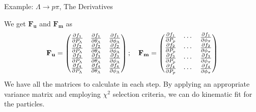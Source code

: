 \documentclass[
	xcolor=dvipsnames,
	aspectratio=169,	
	10pt, 
	]{beamer}
\begin{document}
\begin{frame}{Example: $\Lambda\to p\pi$, The Derivatives}
	\begin{block}{}
		 We get $\mathbf{F_u}$ and $\mathbf{F_m}$ as
		\begin{align}
			\mathbf{F_u}=
			\begin{pmatrix}
				\frac{\partial f_1}{\partial P_\Lambda}&\frac{\partial f_1}{\partial \theta_\Lambda}&\frac{\partial f_1}{\partial \phi_\Lambda}\\
				\frac{\partial f_2}{\partial P_\Lambda}&\frac{\partial f_2}{\partial \theta_\Lambda}&\frac{\partial f_2}{\partial \phi_\Lambda}\\
				\frac{\partial f_3}{\partial P_\Lambda}&\frac{\partial f_3}{\partial \theta_\Lambda}&\frac{\partial f_3}{\partial \phi_\Lambda}\\
				\frac{\partial f_4}{\partial P_\Lambda}&\frac{\partial f_4}{\partial \theta_\Lambda}&\frac{\partial f_4}{\partial \phi_\Lambda}
			\end{pmatrix};\quad \mathbf{F_m}=\begin{pmatrix}
				\frac{\partial f_1}{\partial P_p} &\cdots&\frac{\partial f_1}{\partial \phi_\pi} \\
				\frac{\partial f_2}{\partial P_p} &\cdots&\frac{\partial f_2}{\partial \phi_\pi}\\
				\frac{\partial f_3}{\partial P_p} &\cdots&\frac{\partial f_3}{\partial \phi_\pi}\\
				\frac{\partial f_4}{\partial P_p} &\cdots&\frac{\partial f_4}{\partial \phi_\pi}
			\end{pmatrix}
		\end{align}
		We have all the matrices to calculate in each step. By applying an appropriate variance matrix and employing $\chi^2$ selection criteria, we can do kinematic fit for the particles.
	\end{block}
\end{frame}
\end{document}
